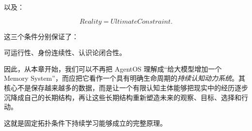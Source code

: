 以及：

\[
\boxed{
Reality
=
UltimateConstraint.
}
\]

这三个条件分别保证了：

\begin{statementbox}
可运行性、身份连续性、认识论闭合性。
\end{statementbox}

因此，从本章开始，我们可以不再把 AgentOS 理解成“给大模型增加一个 Memory System”，而应把它看作一个具有明确生命周期的\emph{持续认知动力系统}。其核心不是保存越来越多的数据，而是让一个有限认知主体能够把现实中的经历逐步沉降成自己的长期结构，再让这些长期结构重新塑造未来的观察、目标、选择和行动。

这就是固定拓扑条件下持续学习能够成立的完整原理。
